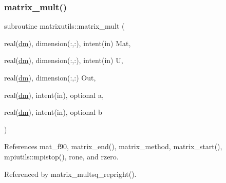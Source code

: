 \subsubsection{\texorpdfstring{matrix\+\_\+mult()}{matrix\_mult()}}
{\footnotesize\ttfamily subroutine matrixutils\+::matrix\+\_\+mult (\begin{DoxyParamCaption}\item[{real(\mbox{\hyperlink{namespacematrixutils_a7bdc564986ea4d90f51201c75606ef3d}{dm}}), dimension(\+:,\+:), intent(in)}]{Mat,  }\item[{real(\mbox{\hyperlink{namespacematrixutils_a7bdc564986ea4d90f51201c75606ef3d}{dm}}), dimension(\+:,\+:), intent(in)}]{U,  }\item[{real(\mbox{\hyperlink{namespacematrixutils_a7bdc564986ea4d90f51201c75606ef3d}{dm}}), dimension(\+:,\+:)}]{Out,  }\item[{real(\mbox{\hyperlink{namespacematrixutils_a7bdc564986ea4d90f51201c75606ef3d}{dm}}), intent(in), optional}]{a,  }\item[{real(\mbox{\hyperlink{namespacematrixutils_a7bdc564986ea4d90f51201c75606ef3d}{dm}}), intent(in), optional}]{b }\end{DoxyParamCaption})}



References mat\+\_\+f90, matrix\+\_\+end(), matrix\+\_\+method, matrix\+\_\+start(), mpiutils\+::mpistop(), rone, and rzero.



Referenced by matrix\+\_\+multsq\+\_\+repright().

